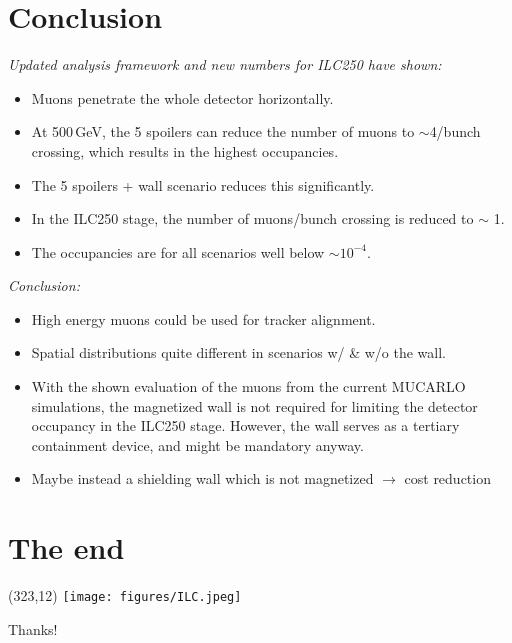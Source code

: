 \documentclass[xcolor={dvipsnames}]{beamer}
\newcommand{\ilclogo}{
  \setlength{\TPHorizModule}{1pt}
  \setlength{\TPVertModule}{1pt}
  \begin{textblock}{1}(323,12)
   \texttt{[image: figures/ILC.jpeg]}
  \end{textblock}
}
\begin{document}
\section{Conclusion}
\begin{frame}
\textit{Updated analysis framework and new numbers for ILC250 have shown:}
\begin{itemize}
 \item Muons penetrate the whole detector horizontally.
 \item At \alert{500\,GeV}, the \alert{5 spoilers} can reduce the number of muons to $\sim$4/bunch crossing, which results in the \alert{highest occupancies}.
 \item The 5 spoilers + wall scenario reduces this significantly.
 \item In the \alert{ILC250 stage}, the number of \alert{muons/bunch crossing is reduced to $\sim$ 1}.
 \item The \alert{occupancies} are for all scenarios \alert{well below $\sim10^{-4}$}.
\end{itemize}
\textit{Conclusion:}
\begin{itemize}
\item High energy muons could be used for tracker alignment.
\item Spatial distributions quite different in scenarios w/ \& w/o the wall.
\item With the shown evaluation of the muons from the current MUCARLO simulations, the \alert{magnetized wall is not required for limiting the detector occupancy in the ILC250 stage}.
However, the wall serves as a tertiary containment device, and might be mandatory anyway.
\item Maybe instead a shielding wall which is not magnetized $\rightarrow$ cost reduction
\end{itemize}
\end{frame}


\section*{The end}
{
\begin{frame}
\ilclogo
\begin{center}
\textcolor{RubineRed}{
	\LARGE Thanks!\\
}
\end{center}
\end{frame}
}
\end{document}
